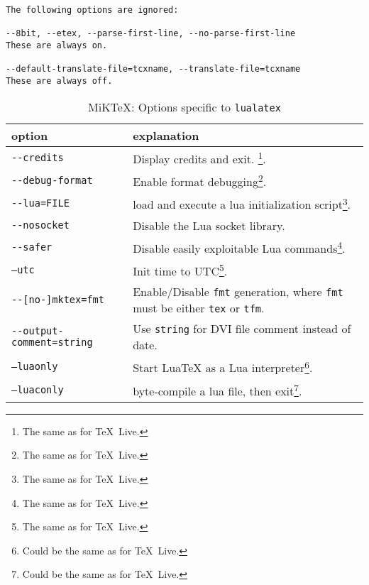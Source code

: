 \documentclass{article}
\newcommand{\lualatex}{\texttt{lualatex}}
\newcommand{\texlive}{\TeX~Live}
\newcommand{\miktex}{MiKTeX}
\begin{document}
{\begin{verbatim}
The following options are ignored:

--8bit, --etex, --parse-first-line, --no-parse-first-line
These are always on.

--default-translate-file=tcxname, --translate-file=tcxname
These are always off.
\end{verbatim}

\begin{longtable}{|ll|}
  \toprule
  option & explanation \\
  \midrule
  \midrule
  \endfirsthead%
  \bottomrule
  \caption{\label{tab:latexOptionsLualatexMiktex} \miktex: Options specific to \lualatex{} }
  \endlastfoot%
  \texttt{-{}-credits}                    & Display credits and exit. \footnote%
  {The same as for \texlive. }. \\
  \texttt{-{}-debug-format}               & Enable format debugging\footnote%
  {The same as for \texlive. }. \\
  \texttt{-{}-lua=FILE}                   & load and execute a lua initialization script\footnote%
  {The same as for \texlive. }.   \\
  \texttt{-{}-nosocket}                   & Disable the Lua socket library. \\
  \texttt{-{}-safer}                      & Disable easily exploitable Lua commands\footnote%
  {The same as for \texlive. }.   \\
  \texttt{--utc}                          & Init time to UTC\footnote%
  {The same as for \texlive. }.  \\
  \midrule
  \texttt{-{}-[no-]mktex=fmt} & Enable/Disable \texttt{fmt} generation, where \texttt{fmt} must be either \texttt{tex} or \texttt{tfm}. \\
  \texttt{-{}-output-comment=string} & Use \texttt{string} for DVI file comment instead of date. \\
  \midrule
  \texttt{--luaonly}                      & Start LuaTeX as a Lua interpreter\footnote%
  {Could be the same as for \texlive. }.  \\
  \texttt{--luaconly}                     & byte-compile a lua file, then exit\footnote%
  {Could be the same as for \texlive. }. \\
  \end{longtable}


}
\end{document}
